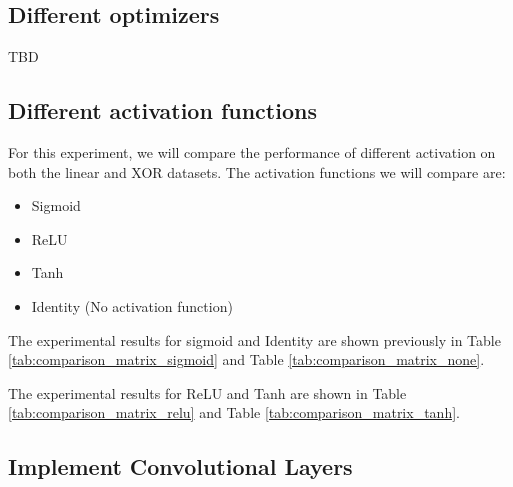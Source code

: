 \subsection{Different optimizers}

TBD

\subsection{Different activation functions}

For this experiment, we will compare the performance of different activation on both the linear and XOR datasets.
The activation functions we will compare are:
\begin{itemize}
    \item Sigmoid
    \item ReLU
    \item Tanh
    \item Identity (No activation function)
\end{itemize}

The experimental results for sigmoid and Identity are shown previously in Table \ref{tab:comparison_matrix_sigmoid} and Table \ref{tab:comparison_matrix_none}.

The experimental results for ReLU and Tanh are shown in Table \ref{tab:comparison_matrix_relu} and Table \ref{tab:comparison_matrix_tanh}.


\subsection{Implement Convolutional Layers}
